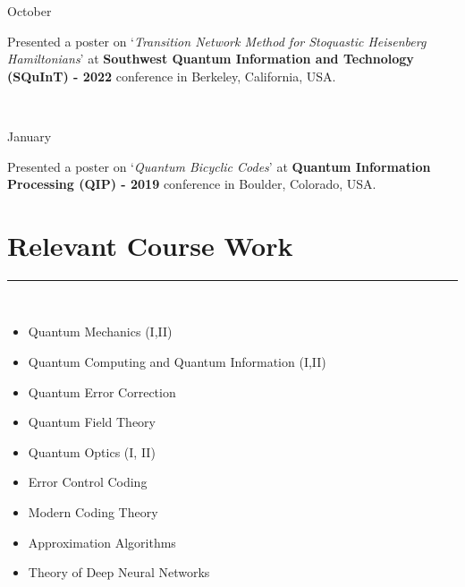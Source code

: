 \documentclass[10pt]{article}
\newcommand\vtick{\textquotesingle}
\begin{document}
\noindent
\begin{minipage}[t]{.2\textwidth}
October\vtick22
\end{minipage}
\begin{minipage}[t]{0.8\textwidth}
Presented a poster on `{\it Transition Network Method for Stoquastic Heisenberg Hamiltonians}' at {\bf Southwest Quantum Information and Technology (SQuInT) - 2022} conference in Berkeley, California, USA.
\end{minipage}\\

\noindent
\begin{minipage}[t]{.2\textwidth}
January\vtick19
\end{minipage}
\begin{minipage}[t]{0.8\textwidth}
Presented a poster on `{\it Quantum Bicyclic Codes}' at {\bf Quantum Information Processing (QIP) - 2019} conference in Boulder, Colorado, USA.
\end{minipage}

\vspace{0.125in}
\section*{\color{black} Relevant Course Work}
\noindent\textcolor{black}{\rule{\textwidth}{1pt}} \vspace{-0.2cm}\\
\begin{minipage}[t]{0.5\textwidth}
\begin{itemize}
    \setlength\itemsep{-.1em}
    \item Quantum Mechanics (I,II)
    \item Quantum Computing and Quantum Information (I,II)
    \item Quantum Error Correction
    \item Quantum Field Theory
    \item Quantum Optics (I, II)
\end{itemize}
\end{minipage}
\begin{minipage}[t]{0.5\textwidth}
\begin{itemize}
    \setlength\itemsep{-.1em}
    \item Error Control Coding
    \item Modern Coding Theory
    \item Approximation Algorithms
    \item Theory of Deep Neural Networks
\end{itemize}
\end{minipage}
\end{document}
